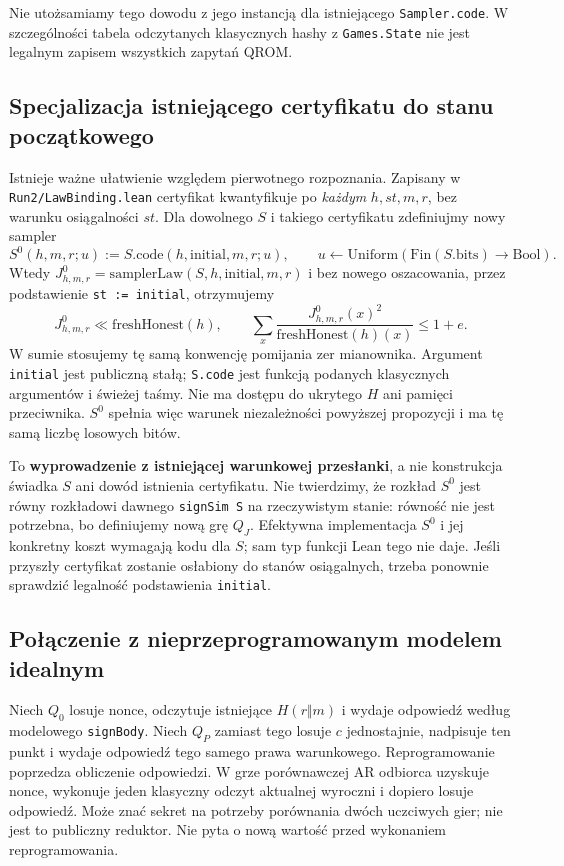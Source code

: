 \documentclass[11pt,a4paper]{article}
\newcommand{\code}[1]{\nolinkurl{#1}}
\begin{document}
Nie utożsamiamy tego dowodu z jego instancją dla istniejącego
\code{Sampler.code}. W szczególności tabela odczytanych klasycznych
hashy z \code{Games.State} nie jest legalnym zapisem wszystkich zapytań QROM.

\subsection*{Specjalizacja istniejącego certyfikatu do stanu początkowego}
Istnieje ważne ułatwienie względem pierwotnego rozpoznania.
Zapisany w \code{Run2/LawBinding.lean} certyfikat kwantyfikuje po
\emph{każdym} $h,st,m,r$, bez warunku osiągalności $st$.
Dla dowolnego $S$ i takiego certyfikatu zdefiniujmy nowy sampler
\[
 S^0(h,m,r;u):=S.\mathrm{code}(h,\mathrm{initial},m,r;u),
 \qquad u\leftarrow\mathrm{Uniform}(\mathrm{Fin}(S.\mathrm{bits})\to\mathrm{Bool}).
\]
Wtedy $J^0_{h,m,r}=\mathrm{samplerLaw}(S,h,\mathrm{initial},m,r)$ i bez
nowego oszacowania, przez podstawienie \code{st := initial}, otrzymujemy
\[
 J^0_{h,m,r}\ll\mathrm{freshHonest}(h),\qquad
 \sum_x\frac{J^0_{h,m,r}(x)^2}{\mathrm{freshHonest}(h)(x)}\le1+e.
\]
W sumie stosujemy tę samą konwencję pomijania zer mianownika.
Argument \code{initial} jest publiczną stałą; \code{S.code} jest funkcją
podanych klasycznych argumentów i świeżej taśmy. Nie ma dostępu do ukrytego
$H$ ani pamięci przeciwnika. $S^0$ spełnia więc warunek niezależności
powyższej propozycji i ma tę samą liczbę losowych bitów.

To \textbf{wyprowadzenie z istniejącej warunkowej przesłanki}, a nie
konstrukcja świadka $S$ ani dowód istnienia certyfikatu.
Nie twierdzimy, że rozkład $S^0$ jest równy rozkładowi dawnego
\code{signSim S} na rzeczywistym stanie: równość nie jest potrzebna,
bo definiujemy nową grę $Q_J$. Efektywna implementacja $S^0$ i jej
konkretny koszt wymagają kodu dla $S$; sam typ funkcji Lean tego nie daje.
Jeśli przyszły certyfikat zostanie osłabiony do stanów osiągalnych,
trzeba ponownie sprawdzić legalność podstawienia \code{initial}.

\subsection*{Połączenie z nieprzeprogramowanym modelem idealnym}
Niech $Q_0$ losuje nonce, odczytuje istniejące $H(r\Vert m)$ i wydaje
odpowiedź według modelowego \code{signBody}. Niech $Q_P$ zamiast tego
losuje $c$ jednostajnie, nadpisuje ten punkt i wydaje odpowiedź tego samego
prawa warunkowego. Reprogramowanie poprzedza obliczenie odpowiedzi.
W grze porównawczej AR odbiorca uzyskuje nonce, wykonuje jeden klasyczny
odczyt aktualnej wyroczni i dopiero losuje odpowiedź. Może znać sekret
na potrzeby porównania dwóch uczciwych gier; nie jest to publiczny reduktor.
Nie pyta o nową wartość przed wykonaniem reprogramowania.
\end{document}
